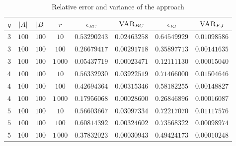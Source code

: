 \begin{table}[ht]
	\centering
	\begin{tabular}{|c|c|c|c|c|c|c|c|}
		\hline
		$q$ & $|A|$ & $|B|$ & $r$      & $\epsilon_{BC}$ & $\textsc{VAR}_{BC}$ & $\epsilon_{FJ}$ & $\textsc{VAR}_{FJ}$ \\ \hline \hline
		$3$ & $100$ & $100$ & $10$     & $0.53290243$    & $0.02463258$        & $0.64549929$    & $0.01098586$        \\ \hline
		$3$ & $100$ & $100$ & $100$    & $0.26679417$    & $0.00291718$        & $0.35897713$    & $0.00141635$        \\ \hline
		$3$ & $100$ & $100$ & $1\,000$ & $0.05437719$    & $0.00023471$        & $0.12111130$    & $0.00015040$        \\ \hline \hline
		$4$ & $100$ & $100$ & $10$     & $0.56332930$    & $0.03922519$        & $0.71466000$    & $0.01504646$        \\ \hline
		$4$ & $100$ & $100$ & $100$    & $0.42694364$    & $0.00315346$        & $0.58182255$    & $0.00148827$        \\ \hline
		$4$ & $100$ & $100$ & $1\,000$ & $0.17956068$    & $0.00028600$        & $0.26846896$    & $0.00016087$        \\ \hline \hline
		$5$ & $100$ & $100$ & $10$     & $0.56603667$    & $0.03097334$        & $0.72217070$    & $0.01117576$        \\ \hline
		$5$ & $100$ & $100$ & $100$    & $0.60814392$    & $0.00324602$        & $0.73568322$    & $0.00098974$        \\ \hline
		$5$ & $100$ & $100$ & $1\,000$ & $0.37832023$    & $0.00030943$        & $0.49424173$    & $0.00010248$        \\ \hline
	\end{tabular}
	\caption{Relative error and variance of the \fsamp approach}	
\end{table}

